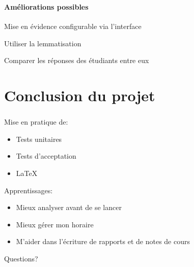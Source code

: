 \documentclass{beamer}
\begin{document}
  \begin{frame}
  \frametitle{\insertsection}
  \framesubtitle{Am\'eliorations possibles}
  Mise en \'evidence configurable via l'interface
  
  Utiliser la lemmatisation
  
  Comparer les r\'eponses des \'etudiants entre eux
  \end{frame}
  \section[Conclusion]{Conclusion du projet}
  \begin{frame}
  \frametitle{\insertsection}
  Mise en pratique de:
  \begin{itemize}
    \item Tests unitaires
    \item Tests d'acceptation
    \item \LaTeX
  \end{itemize}
  
  Apprentissages:
  \begin{itemize}
    \item Mieux analyser avant de se lancer
    \item Mieux g\'erer mon horaire
    \item M'aider dans l'\'ecriture de rapports et de notes de cours
  \end{itemize}
  \end{frame}
  
  \begin{frame}
  \begin{center}
  \Huge Questions?
  \end{center}
  \end{frame}
\end{document}
